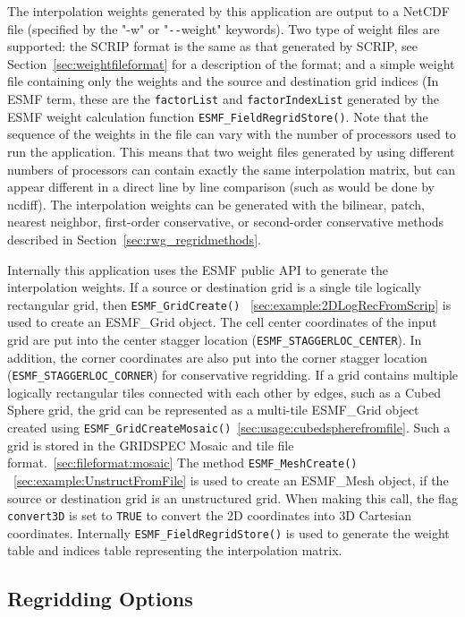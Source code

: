 The interpolation weights generated by this application are output to a NetCDF file (specified by the "-w" or "\verb+--+weight"
keywords). Two type of weight files are supported: the SCRIP format is the same as that generated by SCRIP, see Section~\ref{sec:weightfileformat} for a description of the format; and a simple weight file containing only the weights and the source and destination grid indices (In ESMF
term, these are the {\tt factorList} and {\tt factorIndexList} generated by the ESMF weight calculation function {\tt ESMF\_FieldRegridStore()}.
Note that the sequence of the weights in the file can
vary with the number of processors used to run the application. This means that two weight files generated by using different
numbers of processors can contain exactly the same interpolation matrix, but can appear different in a direct line by line
comparison (such as would be done by ncdiff). The interpolation weights can be generated with
the bilinear, patch, nearest neighbor, first-order conservative, or second-order conservative methods described in Section~\ref{sec:rwg_regridmethods}.

        
Internally this application uses the ESMF public API to generate the interpolation weights.
If a source or destination grid is a single tile logically rectangular grid, then {\tt ESMF\_GridCreate()}
~\ref{sec:example:2DLogRecFromScrip}
is used to create an ESMF\_Grid object. The cell center
coordinates of the input grid are put into the center stagger location ({\tt ESMF\_STAGGERLOC\_CENTER}).
In addition, the corner coordinates are also put into the corner stagger location
({\tt ESMF\_STAGGERLOC\_CORNER}) for conservative regridding.  If a grid contains multiple logically rectangular tiles 
connected with each other by edges, such as a Cubed Sphere grid, the grid can be represented as a multi-tile ESMF\_Grid object created 
using {\tt ESMF\_GridCreateMosaic()}~\ref{sec:usage:cubedspherefromfile}. Such a grid is stored in the GRIDSPEC Mosaic and tile file format.~\ref{sec:fileformat:mosaic}
The method {\tt ESMF\_MeshCreate()} ~\ref{sec:example:UnstructFromFile}
is used to create an ESMF\_Mesh object, if the
source or destination grid is an unstructured grid. When making this call,
the flag {\tt convert3D} is set to {\tt TRUE} to convert the 2D coordinates into 3D Cartesian coordinates. 
Internally {\tt ESMF\_FieldRegridStore()} is used to generate the weight table and indices table representing the interpolation matrix.


\subsection{Regridding Options}\label{sec:rwg_options}

